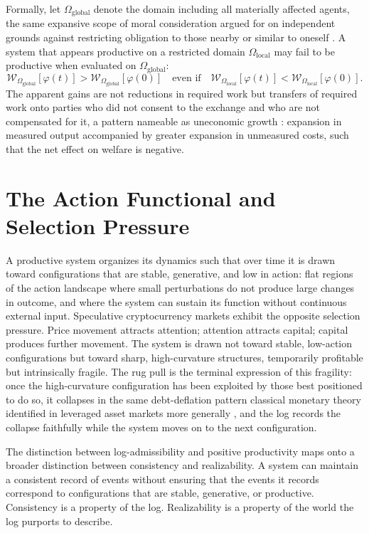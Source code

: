 Formally, let $\Omega_{\mathrm{global}}$ denote the domain including all materially affected agents, the same expansive scope of moral consideration argued for on independent grounds against restricting obligation to those nearby or similar to oneself \cite{singer1972,singer1975}. A system that appears productive on a restricted domain $\Omega_{\mathrm{local}}$ may fail to be productive when evaluated on $\Omega_{\mathrm{global}}$:
\[
\mathcal{W}_{\Omega_{\mathrm{global}}}[\varphi(t)] > \mathcal{W}_{\Omega_{\mathrm{global}}}[\varphi(0)] \quad \text{even if} \quad \mathcal{W}_{\Omega_{\mathrm{local}}}[\varphi(t)] < \mathcal{W}_{\Omega_{\mathrm{local}}}[\varphi(0)].
\]
The apparent gains are not reductions in required work but transfers of required work onto parties who did not consent to the exchange and who are not compensated for it, a pattern nameable as uneconomic growth \cite{daly1996}: expansion in measured output accompanied by greater expansion in unmeasured costs, such that the net effect on welfare is negative.

\section{The Action Functional and Selection Pressure}

A productive system organizes its dynamics such that over time it is drawn toward configurations that are stable, generative, and low in action: flat regions of the action landscape where small perturbations do not produce large changes in outcome, and where the system can sustain its function without continuous external input. Speculative cryptocurrency markets exhibit the opposite selection pressure. Price movement attracts attention; attention attracts capital; capital produces further movement. The system is drawn not toward stable, low-action configurations but toward sharp, high-curvature structures, temporarily profitable but intrinsically fragile. The rug pull is the terminal expression of this fragility: once the high-curvature configuration has been exploited by those best positioned to do so, it collapses in the same debt-deflation pattern classical monetary theory identified in leveraged asset markets more generally \cite{fisher1933}, and the log records the collapse faithfully while the system moves on to the next configuration.

\begin{remark}
The distinction between log-admissibility and positive productivity maps onto a broader distinction between consistency and realizability. A system can maintain a consistent record of events without ensuring that the events it records correspond to configurations that are stable, generative, or productive. Consistency is a property of the log. Realizability is a property of the world the log purports to describe.
\end{remark}

